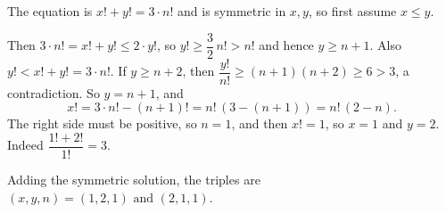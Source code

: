 The equation is $x!+y!=3\cdot n!$ and is symmetric in $x,y$, so first assume $x\le y$.

Then $3\cdot n!=x!+y!\le2\cdot y!$, so $y!\ge\dfrac{3}{2}\,n!>n!$ and hence $y\ge n+1$. Also $y!<x!+y!=3\cdot n!$. If $y\ge n+2$, then $\dfrac{y!}{n!}\ge(n+1)(n+2)\ge6>3$, a contradiction. So $y=n+1$, and
\[
x!=3\cdot n!-(n+1)!=n!\,(3-(n+1))=n!\,(2-n).
\]
The right side must be positive, so $n=1$, and then $x!=1$, so $x=1$ and $y=2$. Indeed $\dfrac{1!+2!}{1!}=3$.

Adding the symmetric solution, the triples are $\boxed{(x,y,n)=(1,2,1)\text{ and }(2,1,1)}$.
